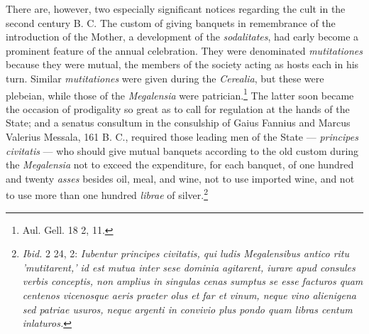 \documentclass[a4paper, 11pt, oneside, polutonikogreek, english]{article}
\begin{document}
There are, however, two especially significant notices regarding the cult in the second century B. C. The custom of giving banquets in remembrance of the introduction of the Mother, a development of the \emph{sodalitates}, had early become a prominent feature of the annual celebration. They were denominated \emph{mutitationes} because they were mutual, the members of the society acting as hosts each in his turn. Similar \emph{mutitationes} were given during the \emph{Cerealia}, but these were plebeian, while those of the \emph{Megalensia} were patrician.\footnote{Aul. Gell. 18 2, 11.} The latter soon became the occasion of prodigality so great as to call for regulation at the hands of the State; and a senatus consultum in the consulship of Gaius Fannius and Marcus Valerius Messala, 161 B. C., required those leading men of the State --- \emph{principes civitatis} --- who should give mutual banquets according to the old custom during the \emph{Megalensia} not to exceed the expenditure, for each banquet, of one hundred and twenty \emph{asses} besides oil, meal, and wine, not to use imported wine, and not to use more than one hundred \emph{librae} of silver.\footnote{\emph{Ibid.} 2 24, 2: \emph{Iubentur principes civitatis, qui ludis Megalensibus antico ritu 'mutitarent,' id est mutua inter sese dominia agitarent, iurare apud consules verbis conceptis, non amplius in singulas cenas sumptus se esse facturos quam centenos vicenosque aeris praeter olus et far et vinum, neque vino alienigena sed patriae usuros, neque argenti in convivio plus pondo quam libras centum inlaturos.}}
\end{document}
